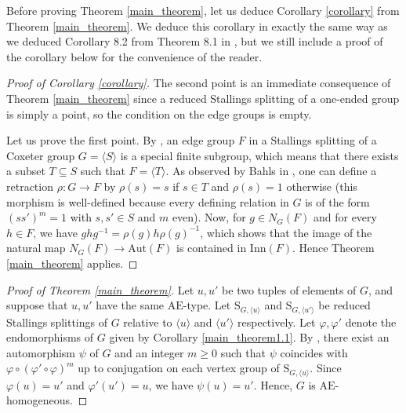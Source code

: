\documentclass[a4paper, 11pt]{amsart}
\theoremstyle{definition}
\theoremstyle{remark}
\newtheorem{rk}[te]{Remark}
\renewcommand{\geq}{\geqslant}
\begin{document}

Before proving Theorem \ref{main_theorem}, let us deduce Corollary \ref{corollary} from Theorem \ref{main_theorem}. We deduce this corollary in exactly the same way as we deduced Corollary 8.2 from Theorem 8.1 in \cite{AP24}, but we still include a proof of the corollary below for the convenience of the reader.

\begin{proof}[Proof of Corollary \ref{corollary}]
The second point is an immediate consequence of Theorem \ref{main_theorem} since a reduced Stallings splitting of a one-ended group is simply a point, so the condition on the edge groups is empty. 

\smallskip \noindent
Let us prove the first point. By \cite[Proposition 8.8.2]{davis}, an edge group $F$ in a Stallings splitting of a Coxeter group $G=\langle S\rangle$ is a special finite subgroup, which means that there exists a subset $T\subseteq S$ such that $F=\langle T\rangle$. As observed by Bahls in \cite[Proposition 5.1]{Bahls}, one can define a retraction $\rho : G\rightarrow F$ by $\rho(s)=s$ if $s\in T$ and $\rho(s)=1$ otherwise (this morphism is well-defined because every defining relation in $G$ is of the form $(ss')^m=1$ with $s,s'\in S$ and $m$ even). Now, for $g\in N_G(F)$ and for every $h\in F$, we have $ghg^{-1}=\rho(g)h\rho(g)^{-1}$, which shows that the image of the natural map $N_G(F)\rightarrow \mathrm{Aut}(F)$ is contained in $\mathrm{Inn}(F)$. Hence Theorem \ref{main_theorem} applies.
\end{proof}


\begin{proof}[Proof of Theorem \ref{main_theorem}]Let $u,u'$ be two tuples of elements of $G$, and suppose that $u,u'$ have the same $\mathrm{AE}$-type. Let $\mathrm{S}_{G,\langle u\rangle}$ and $\mathrm{S}_{G,\langle u'\rangle}$ be reduced Stallings splittings of $G$ relative to $\langle u\rangle$ and $\langle u'\rangle$ respectively. Let $\varphi,\varphi'$ denote the endomorphisms of $G$ given by Corollary \ref{main_theorem1.1}. By \cite[Proposition 8.15]{AP24}, there exist an automorphism $\psi$ of $G$ and an integer $m\geq 0$ such that $\psi$ coincides with $\varphi\circ (\varphi'\circ \varphi)^m$ up to conjugation on each vertex group of $\mathrm{S}_{G,\langle u\rangle}$. Since $\varphi(u)=u'$ and $\varphi'(u')=u$, we have $\psi(u)=u'$. Hence, $G$ is $\mathrm{AE}$-homogeneous.\end{proof}
\end{document}
